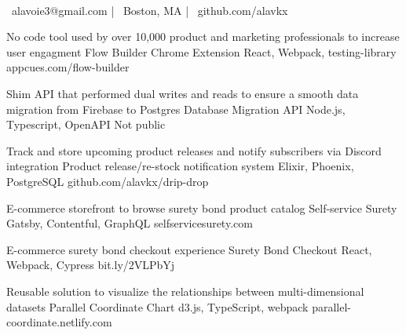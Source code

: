 \documentclass[]{awesome-cv}
\begin{document}
    
\begin{center}
	  \\
	\vspace{2mm}
	{\faEnvelope\ alavoie3@gmail.com} | {\faMapMarker\ Boston, MA} | {\faLink\ github.com/alavkx}
\end{center}

\begin{cventries}
	\cventry
	{No code tool used by over 10,000 product and marketing professionals to increase user engagment}
	{Flow Builder Chrome Extension}
	{React, Webpack, testing-library}
	{appcues.com/flow-builder}
	{}
	
	\vspace{-5mm}
	\cventry
	{Shim API that performed dual writes and reads to ensure a smooth data migration from Firebase to Postgres}
	{Database Migration API}
	{Node.js, Typescript, OpenAPI}
	{Not public}
	{}
	
	\vspace{-5mm}
	\cventry
	{Track and store upcoming product releases and notify subscribers via Discord integration}
	{Product release/re-stock notification system}
	{Elixir, Phoenix, PostgreSQL}
	{github.com/alavkx/drip-drop}
	{}
	
	\vspace{-5mm}
	\cventry
	{E-commerce storefront to browse surety bond product catalog}
	{Self-service Surety}
	{Gatsby, Contentful, GraphQL}
	{selfservicesurety.com}
	{}
	
	\vspace{-5mm}
	\cventry
	{E-commerce surety bond checkout experience}
	{Surety Bond Checkout}
	{React, Webpack, Cypress}
	{bit.ly/2VLPbYj}
	{}

	\vspace{-5mm}
	\cventry
	{Reusable solution to visualize the relationships between multi-dimensional datasets}
	{Parallel Coordinate Chart}
	{d3.js, TypeScript, webpack}
	{parallel-coordinate.netlify.com}
	{}
	
	\vspace{-5mm}
\end{cventries}
\end{document}
